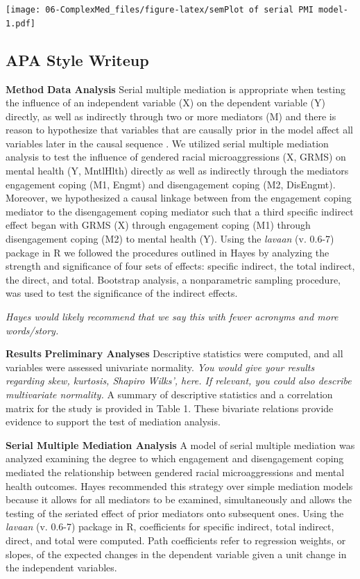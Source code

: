 \documentclass[
  11pt,
]{book}
\begin{document}
\texttt{[image: 06-ComplexMed\_files/figure-latex/semPlot of serial PMI model-1.pdf]}

\hypertarget{apa-style-writeup-2}{%
\subsection{APA Style Writeup}\label{apa-style-writeup-2}}

\textbf{Method} \textbf{Data Analysis} Serial multiple mediation is appropriate when testing the influence of an independent variable (X) on the dependent variable (Y) directly, as well as indirectly through two or more mediators (M) and there is reason to hypothesize that variables that are causally prior in the model affect all variables later in the causal sequence \citep{hayes_introduction_2018}. We utilized serial multiple mediation analysis to test the influence of gendered racial microaggressions (X, GRMS) on mental health (Y, MntlHlth) directly as well as indirectly through the mediators engagement coping (M1, Engmt) and disengagement coping (M2, DisEngmt). Moreover, we hypothesized a causal linkage between from the engagement coping mediator to the disengagement coping mediator such that a third specific indirect effect began with GRMS (X) through engagement coping (M1) through disengagement coping (M2) to mental health (Y). Using the \emph{lavaan} (v. 0.6-7) package in R we followed the procedures outlined in Hayes \citeyearpar{hayes_introduction_2018} by analyzing the strength and significance of four sets of effects: specific indirect, the total indirect, the direct, and total. Bootstrap analysis, a nonparametric sampling procedure, was used to test the significance of the indirect effects.

\emph{Hayes would likely recommend that we say this with fewer acronyms and more words/story.}

\textbf{Results} \textbf{Preliminary Analyses} Descriptive statistics were computed, and all variables were assessed univariate normality. \emph{You would give your results regarding skew, kurtosis, Shapiro Wilks', here. If relevant, you could also describe multivariate normality.} A summary of descriptive statistics and a correlation matrix for the study is provided in Table 1. These bivariate relations provide evidence to support the test of mediation analysis.

\textbf{Serial Multiple Mediation Analysis} A model of serial multiple mediation was analyzed examining the degree to which engagement and disengagement coping mediated the relationship between gendered racial microaggressions and mental health outcomes. Hayes \citeyearpar{hayes_introduction_2018} recommended this strategy over simple mediation models because it allows for all mediators to be examined, simultaneously and allows the testing of the seriated effect of prior mediators onto subsequent ones. Using the \emph{lavaan} (v. 0.6-7) package in R, coefficients for specific indirect, total indirect, direct, and total were computed. Path coefficients refer to regression weights, or slopes, of the expected changes in the dependent variable given a unit change in the independent variables.
\end{document}
